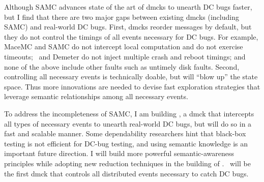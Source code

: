 \documentclass[10pt]{article}
\begin{document}
Although SAMC advances state of the art of dmcks to unearth DC bugs faster, but
I find that there are two major gaps between existing dmcks (including SAMC) and
real-world DC bugs. First, dmcks reorder messages by default, but they do not
control the timings of all events necessary for DC bugs. For example, MaceMC and
SAMC do not intercept local computation and do not exercise timeouts; \modist\
and Demeter do not inject multiple crash and reboot timings; and none of the
above include other faults such as untimely disk faults.
%
Second, controlling all necessary events is technically doable, but will ``blow
up'' the state space. Thus more innovations are needed to devise fast
exploration strategies that leverage semantic relationships among all necessary
events.


To address the incompleteness of SAMC, I am building \fullcheck, a dmck that
intercepts all types of necessary events to unearth real-world DC bugs, but will
do so in a fast and scalable manner. Some dependability researchers hint that
black-box testing is not efficient for DC-bug testing, and using semantic
knowledge is an important future direction. I will build more powerful
semantic-awareness principles while adopting new reduction techniques in the
building of \fullcheck. \fullcheck\ will be the first dmck that controls all
distributed events necessary to catch DC bugs.


\end{document}
